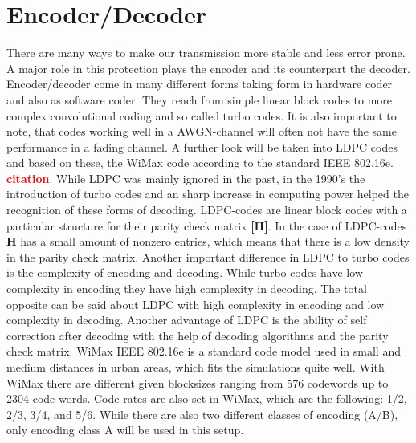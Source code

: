 \documentclass[12pt,oneside, draft]{report}
\newcommand\boldred[1]{\textcolor{red}{\textbf{#1}}}
\begin{document}
\section{Encoder/Decoder}
\label{sec:code}
There are many ways to make our transmission more stable and less error prone. A major role in this protection plays the encoder and its counterpart the decoder. Encoder/decoder come in many different forms taking form in hardware coder and also as software coder. They reach from simple linear block codes to more complex convolutional coding and so called turbo codes. It is also important to note, that codes working well in a AWGN-channel will often not have the same performance in a fading channel. A further look will be taken into \gls{LDPC} codes and based on these, the WiMax code according to the standard IEEE 802.16e. \boldred{citation}. While \gls{LDPC} was mainly ignored in the past, in the 1990's the introduction of turbo codes and an sharp increase in computing power helped the recognition of these forms of decoding.
\newline
\gls{LDPC}-codes are linear block codes with a particular structure for their parity check matrix \textbf{[H]}. In the case of \gls{LDPC}-codes \textbf{H} has a small amount of nonzero entries, which means that there is a low density in the parity check matrix.
Another important difference in LDPC to turbo codes is the complexity of encoding and decoding. While turbo codes have low complexity in encoding they have high complexity in decoding. The total opposite can be said about \gls{LDPC} with high complexity in encoding and low complexity in decoding. Another advantage of \gls{LDPC} is the ability of self correction after decoding with the help of decoding algorithms and the parity check matrix.  
\newline
WiMax IEEE 802.16e is a standard code model used in small and medium distances in urban areas, which fits the simulations quite well. With WiMax there are different given blocksizes ranging from 576 codewords up to 2304 code words. Code rates are also set in WiMax, which are the following: 1/2, 2/3, 3/4, and 5/6. While there are also two different classes of encoding (A/B), only encoding class A will be used in this setup.
\newpage
\end{document}
